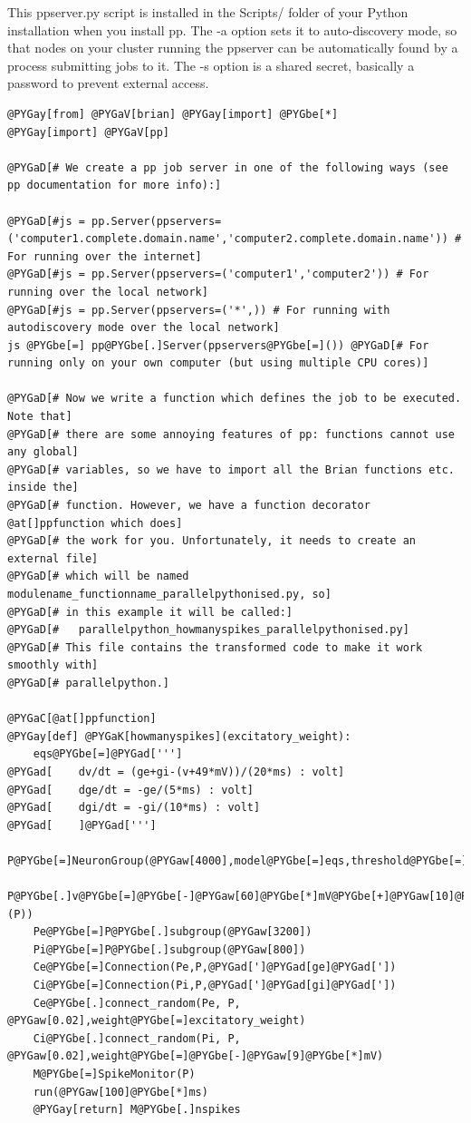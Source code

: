\documentclass[letterpaper,10pt]{manual}
\begin{document}
This ppserver.py script is installed in the Scripts/ folder of your
Python installation when you install pp. The -a option sets it to
auto-discovery mode, so that nodes on your cluster running the ppserver
can be automatically found by a process submitting jobs to it. The -s
option is a shared secret, basically a password to prevent external
access.

\begin{Verbatim}[commandchars=@\[\]]
@PYGay[from] @PYGaV[brian] @PYGay[import] @PYGbe[*]
@PYGay[import] @PYGaV[pp]

@PYGaD[# We create a pp job server in one of the following ways (see pp documentation for more info):]

@PYGaD[#js = pp.Server(ppservers=('computer1.complete.domain.name','computer2.complete.domain.name')) # For running over the internet]
@PYGaD[#js = pp.Server(ppservers=('computer1','computer2')) # For running over the local network]
@PYGaD[#js = pp.Server(ppservers=('*',)) # For running with autodiscovery mode over the local network]
js @PYGbe[=] pp@PYGbe[.]Server(ppservers@PYGbe[=]()) @PYGaD[# For running only on your own computer (but using multiple CPU cores)]

@PYGaD[# Now we write a function which defines the job to be executed. Note that]
@PYGaD[# there are some annoying features of pp: functions cannot use any global]
@PYGaD[# variables, so we have to import all the Brian functions etc. inside the]
@PYGaD[# function. However, we have a function decorator @at[]ppfunction which does]
@PYGaD[# the work for you. Unfortunately, it needs to create an external file]
@PYGaD[# which will be named modulename_functionname_parallelpythonised.py, so]
@PYGaD[# in this example it will be called:]
@PYGaD[#   parallelpython_howmanyspikes_parallelpythonised.py]
@PYGaD[# This file contains the transformed code to make it work smoothly with]
@PYGaD[# parallelpython.]

@PYGaC[@at[]ppfunction]
@PYGay[def] @PYGaK[howmanyspikes](excitatory_weight):
    eqs@PYGbe[=]@PYGad[''']
@PYGad[    dv/dt = (ge+gi-(v+49*mV))/(20*ms) : volt]
@PYGad[    dge/dt = -ge/(5*ms) : volt]
@PYGad[    dgi/dt = -gi/(10*ms) : volt]
@PYGad[    ]@PYGad[''']
    P@PYGbe[=]NeuronGroup(@PYGaw[4000],model@PYGbe[=]eqs,threshold@PYGbe[=]@PYGbe[-]@PYGaw[50]@PYGbe[*]mV,reset@PYGbe[=]@PYGbe[-]@PYGaw[60]@PYGbe[*]mV)
    P@PYGbe[.]v@PYGbe[=]@PYGbe[-]@PYGaw[60]@PYGbe[*]mV@PYGbe[+]@PYGaw[10]@PYGbe[*]mV@PYGbe[*]rand(@PYGaX[len](P))
    Pe@PYGbe[=]P@PYGbe[.]subgroup(@PYGaw[3200])
    Pi@PYGbe[=]P@PYGbe[.]subgroup(@PYGaw[800])
    Ce@PYGbe[=]Connection(Pe,P,@PYGad[']@PYGad[ge]@PYGad['])
    Ci@PYGbe[=]Connection(Pi,P,@PYGad[']@PYGad[gi]@PYGad['])
    Ce@PYGbe[.]connect_random(Pe, P, @PYGaw[0.02],weight@PYGbe[=]excitatory_weight)
    Ci@PYGbe[.]connect_random(Pi, P, @PYGaw[0.02],weight@PYGbe[=]@PYGbe[-]@PYGaw[9]@PYGbe[*]mV)
    M@PYGbe[=]SpikeMonitor(P)
    run(@PYGaw[100]@PYGbe[*]ms)
    @PYGay[return] M@PYGbe[.]nspikes


\end{Verbatim}
\end{document}
